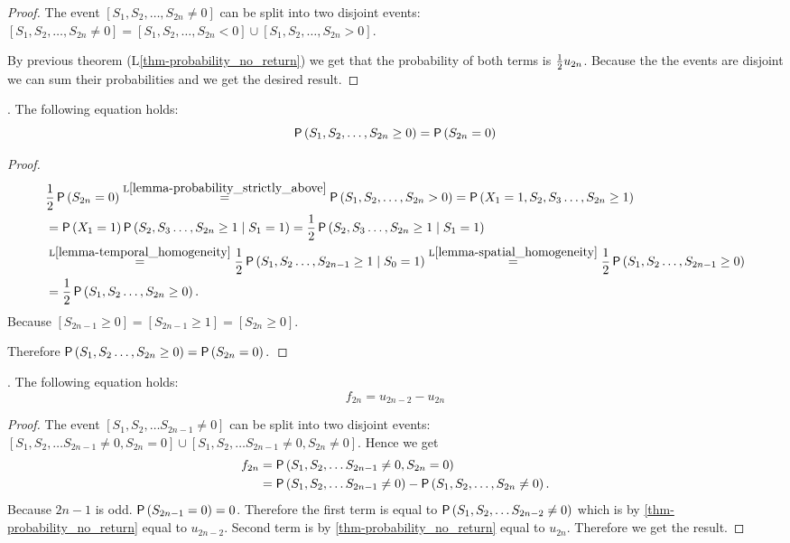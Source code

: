 \begin{proof}
 The event $[S_1, S_2, \ldots, S_{2n}\neq 0]$ can be split into two disjoint events:
 $[S_1, S_2, \ldots, S_{2n}\neq 0]=[S_1, S_2, \ldots, S_{2n} < 0]\cup [S_1, S_2, \ldots, S_{2n} > 0]$.

 By previous theorem (L\ref{thm-probability_no_return}) we get that the probability
 of both terms is $\frac{1}{2} u_{2n}$.
 Because the the events are disjoint we can sum their probabilities and we get the desired result.
\end{proof}
\begin{lemma}\label{lemma-probability_above_or_on}
  \Lrws. The following equation holds:
 \[
 \operatorname{\mathsf{P}} \left( S_1, S_2, \ldots, S_{2n} \geq 0 \right)
 =\operatorname{\mathsf{P}} \left( S_{2n}=0 \right)
 \]
\end{lemma}
\begin{proof}
\[
  \begin{split}
    & \frac{1}{2} \operatorname{\mathsf{P}}\left(S_{2n}=0 \right)\overset{\text{L}\ref{lemma-probability_strictly_above}}{=}\operatorname{\mathsf{P}} \left( S_1, S_2, \ldots, S_{2n}>0 \right)
    =\operatorname{\mathsf{P}} \left( X_1=1, S_2, S_3 \ldots, S_{2n}\geq 1 \right)\\
    & = \operatorname{\mathsf{P}} \left(X_1=1 \right)\operatorname{\mathsf{P}} \left(S_2, S_3 \ldots, S_{2n}\geq 1 \;\middle\vert\; S_1=1\right)
    =\frac{1}{2} \operatorname{\mathsf{P}} \left( S_2, S_3 \ldots, S_{2n}\geq 1 \mid S_1=1 \right)\\
    & \overset{\text{L}\ref{lemma-temporal_homogeneity}}{=}\frac{1}{2} \operatorname{\mathsf{P}} \left( S_1, S_2 \ldots, S_{2n-1}\geq 1 \mid S_0=1 \right)
    \overset{\text{L}\ref{lemma-spatial_homogeneity}}{=}\frac{1}{2} \operatorname{\mathsf{P}} \left( S_1, S_2 \ldots, S_{2n-1}\geq 0 \right)\\
    & =\frac{1}{2} \operatorname{\mathsf{P}} \left( S_1, S_2 \ldots, S_{2n}\geq 0 \right).
  \end{split}
 \]
 Because $[S_{2n-1}\geq 0]=[S_{2n-1}\geq 1]=[S_{2n}\geq 0].$

 Therefore $\operatorname{\mathsf{P}} \left( S_1, S_2 \ldots, S_{2n}\geq 0 \right)=\operatorname{\mathsf{P}}\left(S_{2n}=0 \right).$
\end{proof}
\begin{thm}\label{thm-f_2n}
  \Lrws. The following equation holds:
 \[
 f_{2n}=u_{2n-2}-u_{2n}
 \]
\end{thm}
\begin{proof}
 The event $[S_1, S_2, \ldots S_{2n-1}\neq 0]$ can be split into two disjoint events:
 $[S_1, S_2, \ldots S_{2n-1}\neq 0, S_{2n}=0] \cup [S_1, S_2, \ldots S_{2n-1}\neq 0, S_{2n}\neq 0]$.
 Hence we get
\[
  \begin{split}
    f_{2n} & =\operatorname{\mathsf{P}} \left( S_1, S_2, \ldots S_{2n-1}\neq 0, S_{2n}=0 \right)\\
    & =\operatorname{\mathsf{P}} \left( S_1, S_2, \ldots S_{2n-1}\neq 0 \right) -\operatorname{\mathsf{P}} \left( S_1, S_2, \ldots, S_{2n}\neq 0 \right).
  \end{split}
 \]
 Because $2n-1$ is odd. $\operatorname{\mathsf{P}} \left( S_{2n-1}=0 \right) =0$.
 Therefore the first term is equal to $\operatorname{\mathsf{P}} \left( S_1, S_2, \ldots S_{2n-2}\neq 0 \right)$
 which is by \ref{thm-probability_no_return} equal to $u_{2n-2}$. Second term is by \ref{thm-probability_no_return} equal to $u_{2n}$. Therefore we get the result.
\end{proof}

